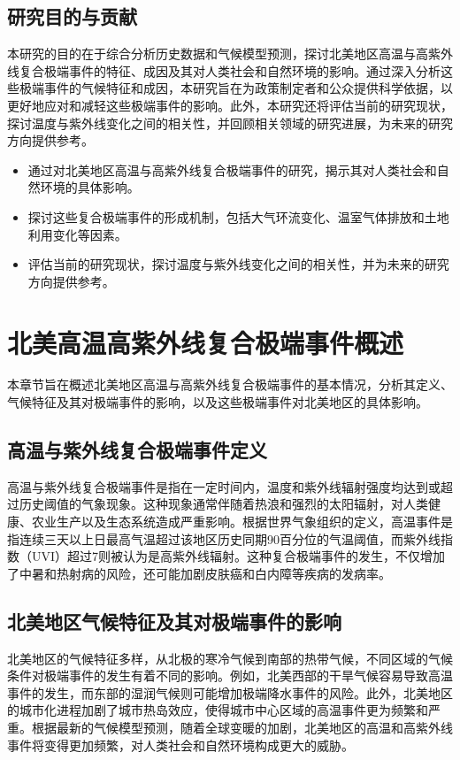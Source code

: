 \documentclass[12pt]{article}
\begin{document}
\subsection{研究目的与贡献}
本研究的目的在于综合分析历史数据和气候模型预测，探讨北美地区高温与高紫外线复合极端事件的特征、成因及其对人类社会和自然环境的影响。通过深入分析这些极端事件的气候特征和成因，本研究旨在为政策制定者和公众提供科学依据，以更好地应对和减轻这些极端事件的影响。此外，本研究还将评估当前的研究现状，探讨温度与紫外线变化之间的相关性，并回顾相关领域的研究进展，为未来的研究方向提供参考。

\begin{itemize}
\item 通过对北美地区高温与高紫外线复合极端事件的研究，揭示其对人类社会和自然环境的具体影响。
\item 探讨这些复合极端事件的形成机制，包括大气环流变化、温室气体排放和土地利用变化等因素。
\item 评估当前的研究现状，探讨温度与紫外线变化之间的相关性，并为未来的研究方向提供参考。
\end{itemize}



\section{北美高温高紫外线复合极端事件概述}
本章节旨在概述北美地区高温与高紫外线复合极端事件的基本情况，分析其定义、气候特征及其对极端事件的影响，以及这些极端事件对北美地区的具体影响。

\subsection{高温与紫外线复合极端事件定义}
高温与紫外线复合极端事件是指在一定时间内，温度和紫外线辐射强度均达到或超过历史阈值的气象现象。这种现象通常伴随着热浪和强烈的太阳辐射，对人类健康、农业生产以及生态系统造成严重影响。根据世界气象组织的定义，高温事件是指连续三天以上日最高气温超过该地区历史同期90百分位的气温阈值，而紫外线指数（UVI）超过7则被认为是高紫外线辐射。这种复合极端事件的发生，不仅增加了中暑和热射病的风险，还可能加剧皮肤癌和白内障等疾病的发病率。

\subsection{北美地区气候特征及其对极端事件的影响}
北美地区的气候特征多样，从北极的寒冷气候到南部的热带气候，不同区域的气候条件对极端事件的发生有着不同的影响。例如，北美西部的干旱气候容易导致高温事件的发生，而东部的湿润气候则可能增加极端降水事件的风险。此外，北美地区的城市化进程加剧了城市热岛效应，使得城市中心区域的高温事件更为频繁和严重。根据最新的气候模型预测，随着全球变暖的加剧，北美地区的高温和高紫外线事件将变得更加频繁，对人类社会和自然环境构成更大的威胁。
\end{document}
